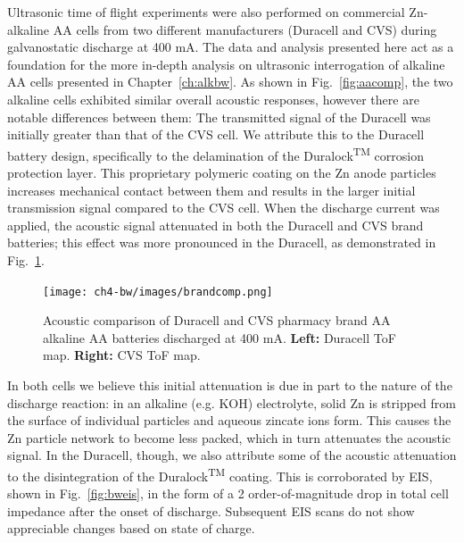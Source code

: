 Ultrasonic time of flight experiments were also performed on commercial Zn- alkaline AA cells from two different manufacturers (Duracell and CVS) during galvanostatic discharge at 400 mA. The data and analysis presented here act as a foundation for the more in-depth analysis on ultrasonic interrogation of alkaline AA cells presented in Chapter~\ref{ch:alkbw}. As shown in Fig.~\ref{fig:aacomp}, the two alkaline cells exhibited similar overall acoustic responses, however there are notable differences between them: The transmitted signal of the Duracell was initially greater than that of the CVS cell. We attribute this to the Duracell battery design, specifically to the delamination of the Duralock\textsuperscript{TM} corrosion protection layer. This proprietary polymeric coating on the Zn anode particles increases mechanical contact between them and results in the larger initial transmission signal compared to the CVS cell. When the discharge current was applied, the acoustic signal attenuated in both the Duracell and CVS brand batteries; this effect was more pronounced in the Duracell, as demonstrated in Fig.~\ref{fig:bwbrandcomp}.

\begin{figure}[htb]
  \centering
    \texttt{[image: ch4-bw/images/brandcomp.png]}
    \caption[Acoustic comparison of Duracell and CVS pharmacy brand AA alkaline AA batteries.]{Acoustic comparison of Duracell and CVS pharmacy brand AA alkaline AA batteries discharged at 400 mA. \textbf{Left:} Duracell ToF map. \textbf{Right:} CVS ToF map.}
    \label{fig:bwbrandcomp}
\end{figure}

In both cells we believe this initial attenuation is due in part to the nature of the discharge reaction: in an alkaline (e.g. KOH) electrolyte, solid Zn is stripped from the surface of individual particles and aqueous zincate  ions form. This causes the Zn particle network to become less packed, which in turn attenuates the acoustic signal. In the Duracell, though, we also attribute some of the acoustic attenuation to the disintegration of the Duralock\textsuperscript{TM} coating. This is corroborated by EIS, shown in Fig.~\ref{fig:bweis}, in the form of a 2 order-of-magnitude drop in total cell impedance after the onset of discharge. Subsequent EIS scans do not show appreciable changes based on state of charge.

